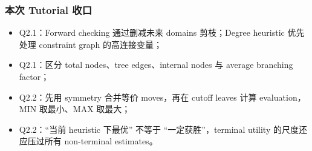 \subsubsection*{本次 Tutorial 收口}

\begin{itemize}
  \item Q2.1：Forward checking 通过删减未来 domains 剪枝；Degree heuristic 优先处理 constraint graph 的高连接变量；
  \item Q2.1：区分 total nodes、tree edges、internal nodes 与 average branching factor；
  \item Q2.2：先用 symmetry 合并等价 moves，再在 cutoff leaves 计算 evaluation，MIN 取最小、MAX 取最大；
  \item Q2.2：``当前 heuristic 下最优'' 不等于 ``一定获胜''，terminal utility 的尺度还应压过所有 non-terminal estimates。
\end{itemize}

